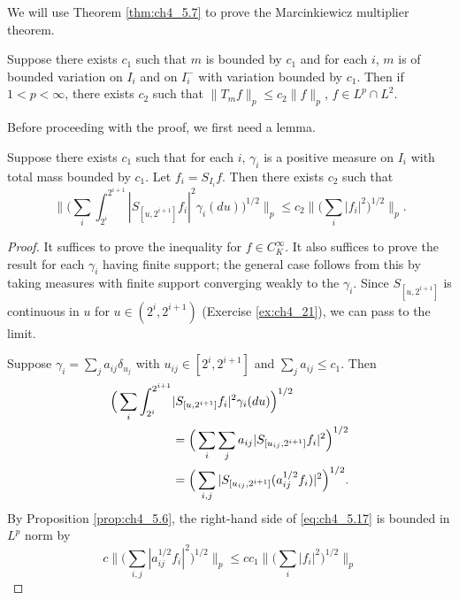 
We will use Theorem \ref{thm:ch4_5.7} to prove the Marcinkiewicz multiplier theorem.

\begin{theorem}\label{thm:ch4_5.8}
Suppose there exists $c_1$ such that $m$ is bounded by $c_1$ and for each $i$, $m$ is of bounded variation on $I_i$ and on $I_i^-$ with variation bounded by $c_1$. Then if $1 < p < \infty$, there exists $c_2$ such that $\|T_mf\|_p \leq c_2\|f\|_p$, $f \in L^p \cap L^2$.
\end{theorem}

Before proceeding with the proof, we first need a lemma.

\begin{lemma}\label{lem:ch4_5.9}
Suppose there exists $c_1$ such that for each $i$, $\gamma_i$ is a positive measure on $I_i$ with total mass bounded by $c_1$. Let $f_i = S_{I_i}f$. Then there exists $c_2$ such that
\[
    \Big\|\Big(\sum_i \int_{2^i}^{2^{i+1}} |S_{[u,2^{i+1}]}f_i|^2\gamma_i(du)\Big)^{1/2}\Big\|_p \leq c_2\Big\|\Big(\sum_i |f_i|^2\Big)^{1/2}\Big\|_p.
\]
\end{lemma}

\begin{proof}
It suffices to prove the inequality for $f \in C_K^\infty$. It also suffices to prove the result for each $\gamma_i$ having finite support; the general case follows from this by taking measures with finite support converging weakly to the $\gamma_i$. Since $S_{[u,2^{i+1}]}$ is continuous in $u$ for $u \in (2^i, 2^{i+1})$ (Exercise \ref{ex:ch4_21}), we can pass to the limit.

Suppose $\gamma_i = \sum_j a_{ij}\delta_{u_j}$ with $u_{ij} \in [2^i, 2^{i+1}]$ and $\sum_j a_{ij} \leq c_1$. Then
\begin{align}\label{eq:ch4_5.17}
    \Big(\sum_i \int_{2^i}^{2^{i+1}} &|S_{[u,2^{i+1}]}f_i|^2 \gamma_i(du)\Big)^{1/2} \\
    &= \Big(\sum_i\sum_j a_{ij}|S_{[u_{ij},2^{i+1}]}f_i|^2\Big)^{1/2} \notag \\
    &= \Big(\sum_{i,j} |S_{[u_{ij},2^{i+1}]}(a_{ij}^{1/2}f_i)|^2\Big)^{1/2}. \notag
\end{align}
By Proposition \ref{prop:ch4_5.6}, the right-hand side of \eqref{eq:ch4_5.17} is bounded in $L^p$ norm by
\[
    c\Big\|\Big(\sum_{i,j} |a_{ij}^{1/2}f_i|^2\Big)^{1/2}\Big\|_p \leq cc_1\Big\|\Big(\sum_i |f_i|^2\Big)^{1/2}\Big\|_p
\]

\end{proof}

